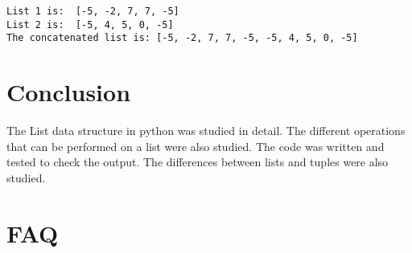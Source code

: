 \documentclass[11pt]{article}
\begin{document}
    \begin{Verbatim}[commandchars=\\\{\}]
List 1 is:  [-5, -2, 7, 7, -5]
List 2 is:  [-5, 4, 5, 0, -5]
The concatenated list is: [-5, -2, 7, 7, -5, -5, 4, 5, 0, -5]
    \end{Verbatim}

\section{Conclusion}
The List data structure in python was studied in detail. The different operations that can be performed on a list were also studied. The code was written and tested to check the output. The differences between lists and tuples were also studied.

\clearpage

\section{FAQ}
\end{document}
